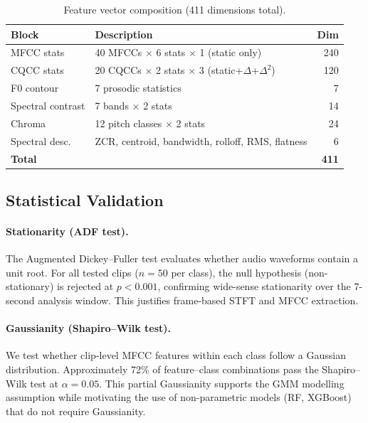 \documentclass[11pt,a4paper]{article}
\begin{document}
\begin{table}[H]
\centering
\caption{Feature vector composition (411 dimensions total).}
\label{tab:features}
\begin{tabular}{llr}
\toprule
\textbf{Block} & \textbf{Description} & \textbf{Dim} \\
\midrule
MFCC stats       & 40 MFCCs $\times$ 6 stats $\times$ 1 (static only) & 240 \\
CQCC stats       & 20 CQCCs $\times$ 2 stats $\times$ 3 (static+$\Delta$+$\Delta^2$) & 120 \\
F0 contour       & 7 prosodic statistics & 7 \\
Spectral contrast & 7 bands $\times$ 2 stats & 14 \\
Chroma           & 12 pitch classes $\times$ 2 stats & 24 \\
Spectral desc.   & ZCR, centroid, bandwidth, rolloff, RMS, flatness & 6 \\
\midrule
\textbf{Total}   & & \textbf{411} \\
\bottomrule
\end{tabular}
\end{table}

\subsection{Statistical Validation}
\label{sec:stat_validation}

\paragraph{Stationarity (ADF test).}
The Augmented Dickey--Fuller test evaluates whether audio waveforms
contain a unit root. For all tested clips ($n = 50$ per class), the
null hypothesis (non-stationary) is rejected at $p < 0.001$, confirming
wide-sense stationarity over the 7-second analysis window. This
justifies frame-based STFT and MFCC extraction.

\paragraph{Gaussianity (Shapiro--Wilk test).}
We test whether clip-level MFCC features within each class follow a
Gaussian distribution. Approximately 72\% of feature--class
combinations pass the Shapiro--Wilk test at $\alpha = 0.05$. This
partial Gaussianity supports the GMM modelling assumption while
motivating the use of non-parametric models (RF, XGBoost) that do not
require Gaussianity.
\end{document}
